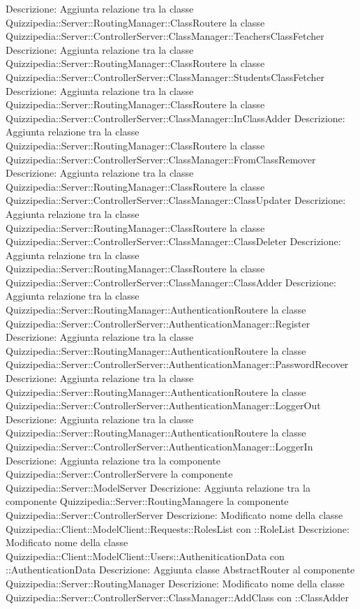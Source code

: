 Descrizione: Aggiunta relazione tra la classe Quizzipedia::Server::RoutingManager::ClassRoutere la classe Quizzipedia::Server::ControllerServer::ClassManager::TeachersClassFetcher 
Descrizione: Aggiunta relazione tra la classe Quizzipedia::Server::RoutingManager::ClassRoutere la classe Quizzipedia::Server::ControllerServer::ClassManager::StudentsClassFetcher 
Descrizione: Aggiunta relazione tra la classe Quizzipedia::Server::RoutingManager::ClassRoutere la classe Quizzipedia::Server::ControllerServer::ClassManager::InClassAdder 
Descrizione: Aggiunta relazione tra la classe Quizzipedia::Server::RoutingManager::ClassRoutere la classe Quizzipedia::Server::ControllerServer::ClassManager::FromClassRemover 
Descrizione: Aggiunta relazione tra la classe Quizzipedia::Server::RoutingManager::ClassRoutere la classe Quizzipedia::Server::ControllerServer::ClassManager::ClassUpdater 
Descrizione: Aggiunta relazione tra la classe Quizzipedia::Server::RoutingManager::ClassRoutere la classe Quizzipedia::Server::ControllerServer::ClassManager::ClassDeleter 
Descrizione: Aggiunta relazione tra la classe Quizzipedia::Server::RoutingManager::ClassRoutere la classe Quizzipedia::Server::ControllerServer::ClassManager::ClassAdder 
Descrizione: Aggiunta relazione tra la classe Quizzipedia::Server::RoutingManager::AuthenticationRoutere la classe Quizzipedia::Server::ControllerServer::AuthenticationManager::Register 
Descrizione: Aggiunta relazione tra la classe Quizzipedia::Server::RoutingManager::AuthenticationRoutere la classe Quizzipedia::Server::ControllerServer::AuthenticationManager::PasswordRecover 
Descrizione: Aggiunta relazione tra la classe Quizzipedia::Server::RoutingManager::AuthenticationRoutere la classe Quizzipedia::Server::ControllerServer::AuthenticationManager::LoggerOut 
Descrizione: Aggiunta relazione tra la classe Quizzipedia::Server::RoutingManager::AuthenticationRoutere la classe Quizzipedia::Server::ControllerServer::AuthenticationManager::LoggerIn 
Descrizione: Aggiunta relazione tra la componente Quizzipedia::Server::ControllerServere la componente Quizzipedia::Server::ModelServer 
Descrizione: Aggiunta relazione tra la componente Quizzipedia::Server::RoutingManagere la componente Quizzipedia::Server::ControllerServer 
Descrizione: Modificato nome della classe Quizzipedia::Client::ModelClient::Requests::RolesList con ::RoleList 
Descrizione: Modificato nome della classe Quizzipedia::Client::ModelClient::Users::AutheniticationData con ::AuthenticationData 
Descrizione: Aggiunta classe AbstractRouter al componente Quizzipedia::Server::RoutingManager 
Descrizione: Modificato nome della classe Quizzipedia::Server::ControllerServer::ClassManager::AddClass con ::ClassAdder 
